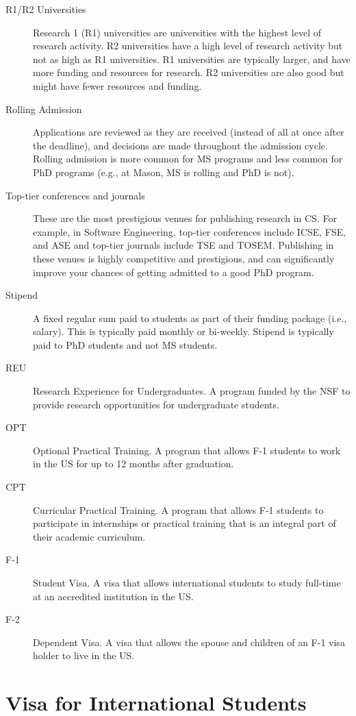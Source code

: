 \documentclass[oneside,11pt,dvipsnames]{book}
\begin{document}
\begin{description}
  \item [R1/R2 Universities] Research 1 (R1) universities are universities with the highest level of research activity. R2 universities have a high level of research activity but not as high as R1 universities.  R1 universities are typically larger, and have more funding and resources for research.  R2 universities are also good but might have fewer resources and funding.
  
    \item [Rolling Admission] Applications are reviewed as they are received (instead of all at once after the deadline), and decisions are made throughout the admission cycle.  Rolling admission is more common for MS programs and less common for PhD programs (e.g., at Mason, MS is rolling and PhD is not).

  \item [Top-tier conferences and journals] These are the most prestigious venues for publishing research in CS.  For example, in Software Engineering, top-tier conferences include ICSE, FSE, and ASE and top-tier journals include TSE and TOSEM.  Publishing in these venues is highly competitive and prestigious, and can significantly improve your chances of getting admitted to a good PhD program.

        \item [Stipend] A fixed regular sum paid to students as part of their funding package (i.e., salary). This is typically paid monthly or bi-weekly.  Stipend is typically paid to PhD students and not MS students.
  \item[REU] Research Experience for Undergraduates. A program funded by the NSF to provide research opportunities for undergraduate students.
    \item[OPT] Optional Practical Training. A program that allows F-1 students to work in the US for up to 12 months after graduation.
  \item[CPT] Curricular Practical Training. A program that allows F-1 students to participate in internships or practical training that is an integral part of their academic curriculum.
  \item[F-1] Student Visa. A visa that allows international students to study full-time at an accredited institution in the US.
  \item[F-2] Dependent Visa. A visa that allows the spouse and children of an F-1 visa holder to live in the US.
\end{description}

\chapter{Visa for International Students}\label{sec:visa}
\end{document}
